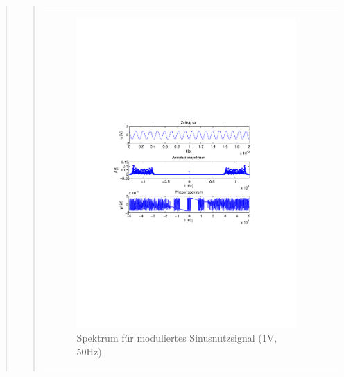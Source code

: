 \begin{quote}
\begin{quote}
\begin{center}
\begin{tabular}{ll}
\begin{minipage}{0.6\textwidth}
                \end{minipage}
                \begin{minipage}{0.6\textwidth}

                     \begin{figure}[H]
                        \label{fig:}
                        \includegraphics[scale=0.5, trim = 4cm 9.5cm 3.5cm
                        9.5cm, clip]{./Bilder/sin_a1_f50}
                        \caption{Spektrum für moduliertes Sinusnutzsignal (1V,
                        50Hz)}
                    \end{figure}
               \vspace{-1.5em}

                \end{minipage}


\end{tabular}
\end{center}
\end{quote}
\end{quote}
